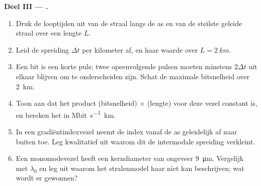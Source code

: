 \begin{problem}
\medskip
\noindent\textbf{Deel III --- .}
\begin{enumerate}[resume]
  \item Druk de looptijden uit van de straal langs de as en van de steilste
        geleide straal over een lengte $L$.
  \item Leid de spreiding $\Delta t$ per kilometer af, en haar waarde over
        $L = \qty{2}{km}$.
  \item Een bit is een korte puls; twee opeenvolgende pulsen moeten
        minstens $2\Delta t$ uit elkaar blijven om te onderscheiden zijn.
        Schat de maximale bitsnelheid over \qty{2}{km}.
  \item Toon aan dat het product (bitsnelheid) $\times$ (lengte) voor deze
        vezel constant is, en bereken het in \unit{Mbit.s^{-1}.km}.
  \item In een gradiëntindexvezel neemt de index vanaf de as geleidelijk af
        naar buiten toe. Leg kwalitatief uit waarom dit de intermodale
        spreiding verkleint.
  \item Een monomodevezel heeft een kerndiameter van ongeveer \qty{9}{\micro m}.
        Vergelijk met $\lambda_0$ en leg uit waarom het stralenmodel haar
        niet kan beschrijven; wat wordt er gewonnen?
\end{enumerate}


\end{problem}
